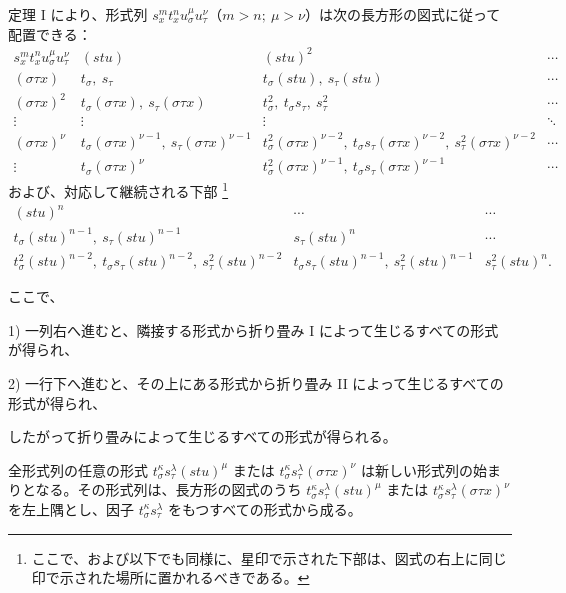 \documentclass[11pt]{article}
\begin{document}
定理 I により、形式列 $s_x^m t_x^n u_\sigma^\mu u_\tau^\nu$（$m>n;\ \mu>\nu$）は次の長方形の図式に従って配置できる：
\begingroup\small
\[
\begin{array}{c|c|c|c}
s_x^m t_x^n u_\sigma^\mu u_\tau^\nu
& (stu)
& (stu)^2
& \cdots\\[0.3em]
(\sigma\tau x)
& t_\sigma,\ s_\tau
& t_\sigma(stu),\ s_\tau(stu)
& \cdots\\[0.3em]
(\sigma\tau x)^2
& t_\sigma(\sigma\tau x),\ s_\tau(\sigma\tau x)
& t_\sigma^2,\ t_\sigma s_\tau,\ s_\tau^2
& \cdots\\[0.3em]
\vdots&\vdots&\vdots&\ddots\\[0.3em]
(\sigma\tau x)^\nu
& t_\sigma(\sigma\tau x)^{\nu-1},\ s_\tau(\sigma\tau x)^{\nu-1}
& t_\sigma^2(\sigma\tau x)^{\nu-2},\ t_\sigma s_\tau(\sigma\tau x)^{\nu-2},\ s_\tau^2(\sigma\tau x)^{\nu-2}
& \cdots\\[0.3em]
\vdots
& t_\sigma(\sigma\tau x)^\nu
& t_\sigma^2(\sigma\tau x)^{\nu-1},\ t_\sigma s_\tau(\sigma\tau x)^{\nu-1}
& \cdots
\end{array}
\]
\endgroup
および、対応して継続される下部
\footnote{ここで、および以下でも同様に、星印で示された下部は、図式の右上に同じ印で示された場所に置かれるべきである。}
\begingroup\small
\[
\begin{array}{c|c|c}
(stu)^n & \cdots & \cdots\\[0.3em]
t_\sigma(stu)^{n-1},\ s_\tau(stu)^{n-1}
& s_\tau(stu)^n & \cdots\\[0.3em]
t_\sigma^2(stu)^{n-2},\ t_\sigma s_\tau(stu)^{n-2},\ s_\tau^2(stu)^{n-2}
& t_\sigma s_\tau(stu)^{n-1},\ s_\tau^2(stu)^{n-1}
& s_\tau^2(stu)^n .
\end{array}
\]
\endgroup

ここで、

1) 一列右へ進むと、隣接する形式から折り畳み I によって生じるすべての形式が得られ、

2) 一行下へ進むと、その上にある形式から折り畳み II によって生じるすべての形式が得られ、

したがって折り畳みによって生じるすべての形式が得られる。

全形式列の任意の形式 $t_\sigma^\kappa s_\tau^\lambda(stu)^\mu$ または $t_\sigma^\kappa s_\tau^\lambda(\sigma\tau x)^\nu$ は新しい形式列の始まりとなる。その形式列は、長方形の図式のうち $t_\sigma^\kappa s_\tau^\lambda(stu)^\mu$ または $t_\sigma^\kappa s_\tau^\lambda(\sigma\tau x)^\nu$ を左上隅とし、因子 $t_\sigma^\kappa s_\tau^\lambda$ をもつすべての形式から成る。
\end{document}
